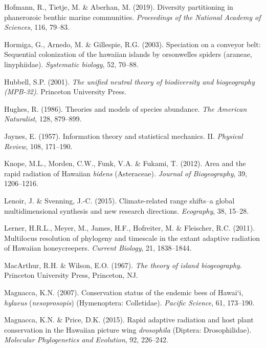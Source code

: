 \documentclass[
  letterpaper,
  DIV=11,
  numbers=noendperiod]{scrartcl}
\newlength{\cslhangindent}
\newenvironment{CSLReferences}[2] %
 {\begin{list}{}{%
  \setlength{\itemindent}{0pt}
  \setlength{\leftmargin}{0pt}
  \setlength{\parsep}{0pt}
  \ifodd #1
   \setlength{\leftmargin}{\cslhangindent}
   \setlength{\itemindent}{-1\cslhangindent}
  \fi
  \setlength{\itemsep}{#2\baselineskip}}}
 {\end{list}}
\begin{document}
\begin{CSLReferences}{1}{0}
Hofmann, R., Tietje, M. \& Aberhan, M. (2019). Diversity partitioning in
phanerozoic benthic marine communities. \emph{Proceedings of the
National Academy of Sciences}, 116, 79--83.

Hormiga, G., Arnedo, M. \& Gillespie, R.G. (2003). Speciation on a
conveyor belt: Sequential colonization of the hawaiian islands by
orsonwelles spiders (araneae, linyphiidae). \emph{Systematic biology},
52, 70--88.

Hubbell, S.P. (2001). \emph{The unified neutral theory of biodiversity
and biogeography (MPB-32)}. Princeton University Press.

Hughes, R. (1986). Theories and models of species abundance. \emph{The
American Naturalist}, 128, 879--899.

Jaynes, E. (1957). {Information theory and statistical mechanics. II}.
\emph{Physical Review}, 108, 171--190.

Knope, M.L., Morden, C.W., Funk, V.A. \& Fukami, T. (2012). Area and the
rapid radiation of {Hawaiian} \emph{bidens} ({Asteraceae}).
\emph{Journal of Biogeography}, 39, 1206--1216.

Lenoir, J. \& Svenning, J.-C. (2015). Climate-related range shifts--a
global multidimensional synthesis and new research directions.
\emph{Ecography}, 38, 15--28.

Lerner, H.R.L., Meyer, M., James, H.F., Hofreiter, M. \& Fleischer, R.C.
(2011). Multilocus resolution of phylogeny and timescale in the extant
adaptive radiation of {Hawaiian} honeycreepers. \emph{Current Biology},
21, 1838--1844.

MacArthur, R.H. \& Wilson, E.O. (1967). \emph{The theory of island
biogeography}. Princeton University Press, Princeton, NJ.

Magnacca, K.N. (2007). Conservation status of the endemic bees of
{Hawai`i}, \emph{hylaeus} (\emph{nesoprosopis}) ({Hymenoptera}:
{Colletidae}). \emph{Pacific Science}, 61, 173--190.

Magnacca, K.N. \& Price, D.K. (2015). Rapid adaptive radiation and host
plant conservation in the {Hawaiian} picture wing \emph{drosophila}
({Diptera}: {Drosophilidae}). \emph{Molecular Phylogenetics and
Evolution}, 92, 226--242.


\end{CSLReferences}
\end{document}

